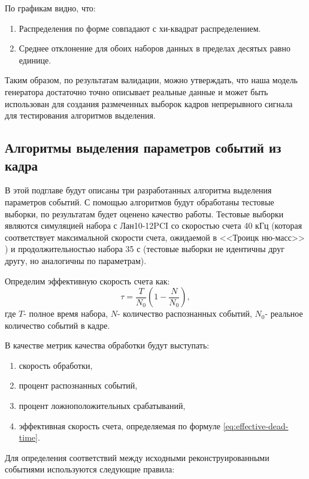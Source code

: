 \documentclass[a4paper,14pt]{extreport}
\begin{document}
По графикам видно, что:

\begin{enumerate}
    \item Распределения по форме совпадают с хи-квадрат распределением.
    \item Среднее отклонение для обоих наборов данных в пределах десятых равно единице.
\end{enumerate}
Таким образом, по результатам валидации, можно утверждать, что наша модель генератора достаточно точно описывает реальные данные и может быть использован для создания размеченных выборок кадров непрерывного сигнала для тестирования алгоритмов выделения.

\subsection{Алгоритмы выделения параметров событий из кадра}

В этой подглаве будут описаны три разработанных алгоритма выделения параметров событий. С помощью алгоритмов будут обработаны тестовые выборки, по результатам будет оценено качество работы. Тестовые выборки являются симуляцией набора с Лан10-12PCI со скоростью счета 40 кГц (которая соответствует максимальной скорости счета, ожидаемой в <<Троицк ню-масс>> ) и продолжительностью набора 35 с (тестовые выборки не идентичны друг другу, но аналогичны по параметрам).

Определим эффективную скорость счета как:
\begin{equation}
    \tau = \frac{T}{N_0} \left(1 - \frac{N}{N_0} \right),
    \label{eq:effective-dead-time}
\end{equation}
где $ T $- полное время набора, $ N $- количество распознанных событий, $ N_0 $- реальное количество событий в кадре.

В качестве метрик качества обработки будут выступать:

\begin{enumerate}
    \item скорость обработки,
    \item процент распознанных событий,
    \item процент ложноположительных срабатываний,
    \item эффективная скорость счета, определяемая по формуле \ref{eq:effective-dead-time}.
\end{enumerate}
Для определения соответствий между исходными реконструированными событиями используются следующие правила:
\end{document}
